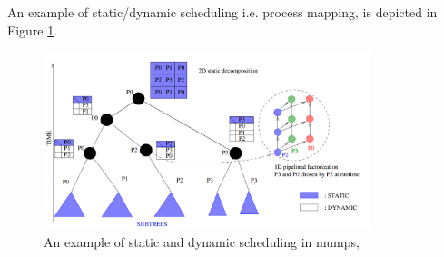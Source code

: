 An example of static/dynamic scheduling i.e. process mapping, is depicted in Figure \ref{fig:mumps:mapping-and-scheduling}.\\


\figpointer{\ref{fig:mumps:mapping-and-scheduling}}
\begin{figure}[htpb]
  \centering
  \includegraphics[width=0.85\textwidth]{figures/chapter-2/mumps-task-data-parallelism-2.png}
    \caption[An example of static and dynamic scheduling in \acrshort{mumps}]{An example of static and dynamic scheduling in \acrshort{mumps}, \cite{l2012multifrontal}}
\label{fig:mumps:mapping-and-scheduling}
\end{figure}


